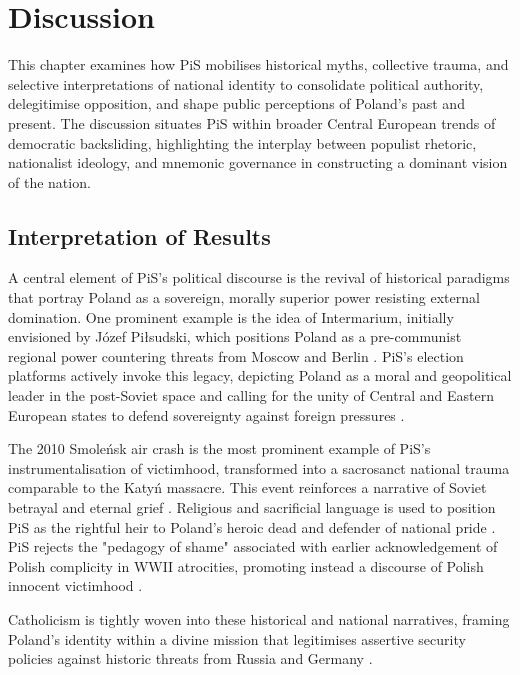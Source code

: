 \chapter[Discussion]{Discussion}
\label{Chap:Discussion}
This chapter examines how PiS mobilises historical myths, collective trauma, and selective interpretations of national identity to consolidate political authority, delegitimise opposition, and shape public perceptions of Poland’s past and present. The discussion situates PiS within broader Central European trends of democratic backsliding, highlighting the interplay between populist rhetoric, nationalist ideology, and mnemonic governance in constructing a dominant vision of the nation.

\section{Interpretation of Results}

A central element of PiS's political discourse is the revival of historical paradigms that portray Poland as a sovereign, morally superior power resisting external domination. One prominent example is the idea of Intermarium, initially envisioned by Józef Piłsudski, which positions Poland as a pre-communist regional power countering threats from Moscow and Berlin \citep{riedel_tri-marium_2022}. PiS's election platforms actively invoke this legacy, depicting Poland as a moral and geopolitical leader in the post-Soviet space and calling for the unity of Central and Eastern European states to defend sovereignty against foreign pressures \citep{pis_program_2023}.

The 2010 Smoleńsk air crash is the most prominent example of PiS’s instrumentalisation of victimhood, transformed into a sacrosanct national trauma comparable to the Katyń massacre. This event reinforces a narrative of Soviet betrayal and eternal grief \citep{fredheim_memory_2014}. Religious and sacrificial language is used to position PiS as the rightful heir to Poland’s heroic dead and defender of national pride \citep{ksiazek_smolensk_2018}. PiS rejects the "pedagogy of shame" associated with earlier acknowledgement of Polish complicity in WWII atrocities, promoting instead a discourse of Polish innocent victimhood \citep{woycicka_mnemonic_2024}.

Catholicism is tightly woven into these historical and national narratives, framing Poland’s identity within a divine mission that legitimises assertive security policies against historic threats from Russia and Germany \citep{lazor_memory_2016}. 


